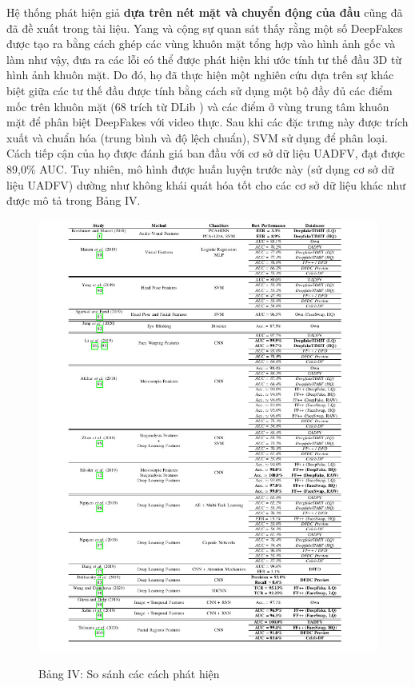 \documentclass{article}
\begin{document}
Hệ thống phát hiện giả \textbf{dựa trên nét mặt và chuyển động của đầu} cũng đã đã đề xuất trong tài liệu. Yang và cộng sự  quan sát thấy rằng một số DeepFakes được tạo ra bằng cách ghép các vùng khuôn mặt tổng hợp vào hình ảnh gốc và làm như vậy, đưa ra các lỗi có thể được phát hiện khi ước tính tư thế đầu 3D từ hình ảnh khuôn mặt. Do đó, họ đã thực hiện một nghiên cứu dựa trên sự khác biệt giữa các tư thế đầu được tính bằng cách sử dụng một bộ đầy đủ các điểm mốc trên khuôn mặt (68 trích từ DLib ) và các điểm ở vùng trung tâm khuôn mặt để phân biệt DeepFakes với video thực. Sau khi các đặc trưng này được trích xuất và chuẩn hóa (trung bình và độ lệch chuẩn), SVM sử dụng để phân loại. Cách tiếp cận của họ được đánh giá ban đầu với cơ sở dữ liệu UADFV, đạt được 89,0\% AUC. Tuy nhiên, mô hình được huấn luyện trước này (sử dụng cơ sở dữ liệu UADFV) dường như không khái quát hóa tốt cho các cơ sở dữ liệu khác như được mô tả trong Bảng IV.

\begin{figure}[h!]
\caption{Bảng IV: So sánh các cách phát hiện}
\includegraphics[width=\textwidth]{table-4-compare}
\label{table-4-compare}
\end{figure}
\end{document}
